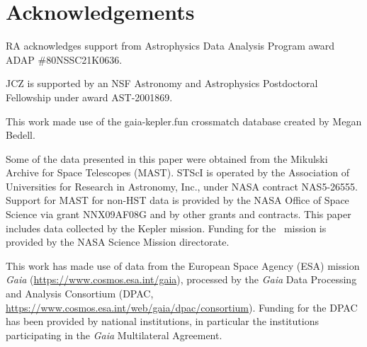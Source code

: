 \section*{Acknowledgements}

RA acknowledges support from Astrophysics Data Analysis Program award ADAP
\#80NSSC21K0636.

JCZ is supported by an NSF Astronomy and Astrophysics Postdoctoral Fellowship
under award AST-2001869.

This work made use of the gaia-kepler.fun crossmatch database created by Megan
Bedell.

Some of the data presented in this paper were obtained from the Mikulski
Archive for Space Telescopes (MAST).
STScI is operated by the Association of Universities for Research in
Astronomy, Inc., under NASA contract NAS5-26555.
Support for MAST for non-HST data is provided by the NASA Office of Space
Science via grant NNX09AF08G and by other grants and contracts.
This paper includes data collected by the Kepler mission. Funding for the
\Kepler\ mission is provided by the NASA Science Mission directorate.

This work has made use of data from the European Space Agency (ESA) mission
{\it Gaia} (\url{https://www.cosmos.esa.int/gaia}), processed by the {\it
Gaia} Data Processing and Analysis Consortium (DPAC,
\url{https://www.cosmos.esa.int/web/gaia/dpac/consortium}).
Funding for the DPAC has been provided by national institutions, in particular
the institutions participating in the {\it Gaia} Multilateral Agreement.

